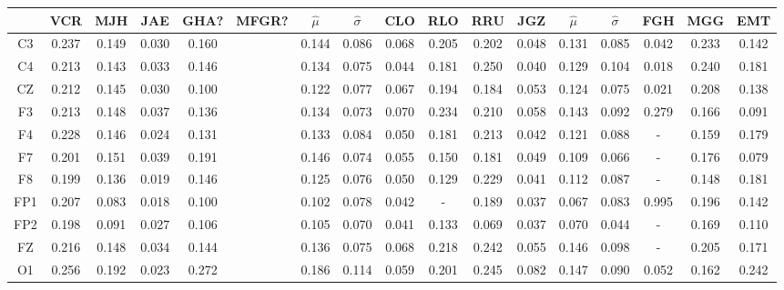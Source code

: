 \begin{SidewaysFigure}
\centering
\begin{tabular}{c||ccccc|cc||cccc|cc||ccc}
& VCR & MJH & JAE & GHA? & MFGR? &$\widehat{\mu}$ & $\widehat{\sigma}$
& CLO & RLO & RRU & JGZ &$\widehat{\mu}$ & $\widehat{\sigma}$
& FGH & MGG & EMT \\
\hline
 C3 & 0.237    & 0.149    & 0.030    & 0.160    && 0.144    & 0.086    & 0.068    & 0.205    & 0.202    & 0.048    & 0.131    & 0.085    & 0.042    & 0.233    & 0.142     \\
 C4 & 0.213    & 0.143    & 0.033    & 0.146    && 0.134    & 0.075    & 0.044    & 0.181    & 0.250    & 0.040    & 0.129    & 0.104    & 0.018    & 0.240    & 0.181     \\
 CZ & 0.212    & 0.145    & 0.030    & 0.100    && 0.122    & 0.077    & 0.067    & 0.194    & 0.184    & 0.053    & 0.124    & 0.075    & 0.021    & 0.208    & 0.138     \\
 F3 & 0.213    & 0.148    & 0.037    & 0.136    && 0.134    & 0.073    & 0.070    & 0.234    & 0.210    & 0.058    & 0.143    & 0.092    & 0.279    & 0.166    & 0.091     \\
 F4 & 0.228    & 0.146    & 0.024    & 0.131    && 0.133    & 0.084    & 0.050    & 0.181    & 0.213    & 0.042    & 0.121    & 0.088    & -      & 0.159    & 0.179     \\
 F7 & 0.201    & 0.151    & 0.039    & 0.191    && 0.146    & 0.074    & 0.055    & 0.150    & 0.181    & 0.049    & 0.109    & 0.066    & -      & 0.176    & 0.079     \\
 F8 & 0.199    & 0.136    & 0.019    & 0.146    && 0.125    & 0.076    & 0.050    & 0.129    & 0.229    & 0.041    & 0.112    & 0.087    & -      & 0.148    & 0.181     \\
 FP1 & 0.207    & 0.083    & 0.018    & 0.100    && 0.102    & 0.078    & 0.042    & -      & 0.189    & 0.037    & 0.067    & 0.083    & 0.995    & 0.196    & 0.142     \\
 FP2 & 0.198    & 0.091    & 0.027    & 0.106    && 0.105    & 0.070    & 0.041    & 0.133    & 0.069    & 0.037    & 0.070    & 0.044    & -      & 0.169    & 0.110     \\
 FZ & 0.216    & 0.148    & 0.034    & 0.144    && 0.136    & 0.075    & 0.068    & 0.218    & 0.242    & 0.055    & 0.146    & 0.098    & -      & 0.205    & 0.171     \\
 O1 & 0.256    & 0.192    & 0.023    & 0.272    && 0.186    & 0.114    & 0.059    & 0.201    & 0.245    & 0.082    & 0.147    & 0.090    & 0.052    & 0.162    & 0.242     \\

\end{tabular}
\end{SidewaysFigure}
